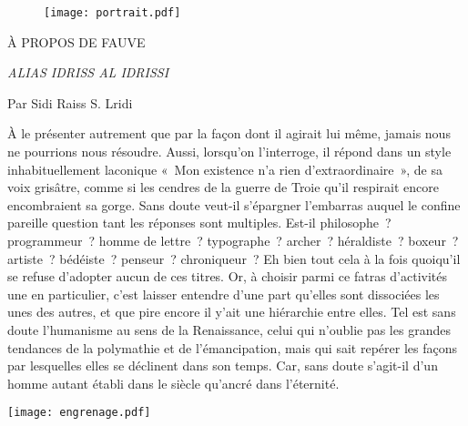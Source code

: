 \newpage
\thispagestyle{empty}
\begin{center}
\begin{figure}[h]
\centering
\texttt{[image: portrait.pdf]}
\captionsetup{labelformat=empty}
\caption[Effigie de Fauve]{}
\end{figure}

\vspace{3pt}

{\Large À PROPOS DE FAUVE}

\vspace{8pt}

  {\em \color{rouge} ALIAS IDRISS AL IDRISSI}

\vspace{8pt}

{\footnotesize Par Sidi Raiss S. Lridi}

\vspace{10pt}
\end{center}

\shapepar{\authorshape} 
À le présenter autrement que par la façon dont il agirait lui même, jamais nous ne pourrions nous résoudre. Aussi, lorsqu’on l’interroge, il répond dans un style inhabituellement laconique « Mon existence n’a rien d’extraordinaire », de sa voix grisâtre, comme si les cendres de la guerre de Troie qu’il respirait encore encombraient sa gorge. Sans doute veut-il s’épargner l’embarras auquel le confine pareille question tant les réponses sont multiples. Est-il philosophe ? programmeur ? homme de lettre ? typographe ? archer ? héraldiste ? boxeur ? artiste ? bédéiste ? penseur ? chroniqueur ? Eh bien tout cela à la fois quoiqu’il se refuse d’adopter aucun de ces titres. Or, à choisir parmi ce fatras d’activités une en particulier, c’est laisser entendre d’une part qu’elles sont dissociées les unes des autres, et que pire encore il y’ait une hiérarchie entre elles. Tel est sans doute l’humanisme au sens de la Renaissance, celui qui n’oublie pas les grandes tendances de la polymathie et de l’émancipation, mais qui sait repérer les façons par lesquelles elles se déclinent dans son temps.
Car, sans doute s’agit-il d’un homme autant établi dans le siècle qu’ancré dans l’éternité.

\begin{center}
\texttt{[image: engrenage.pdf]}
\end{center}

\restoregeometry
